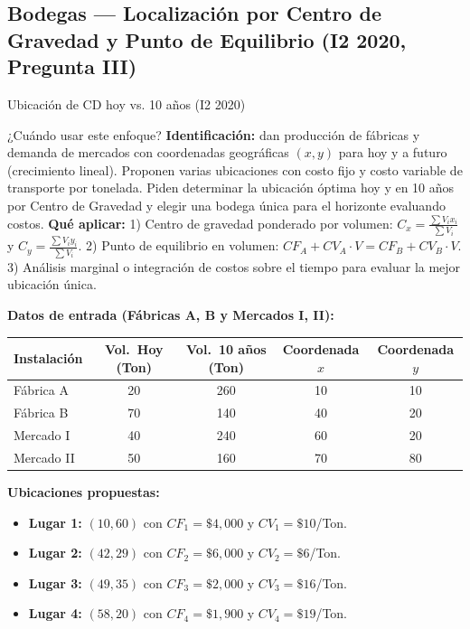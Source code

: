 \subsection[Bodegas: Localización (I2 2020)]{Bodegas --- Localización por Centro de Gravedad y Punto de Equilibrio (I2 2020, Pregunta III)}

\begin{ejercicio}{Ubicación de CD hoy vs. 10 años (I2 2020)}

\begin{tipprueba}{¿Cuándo usar este enfoque?}
\textbf{Identificación:} dan producción de fábricas y demanda de mercados con coordenadas geográficas $(x,y)$ para hoy y a futuro (crecimiento lineal). Proponen varias ubicaciones con costo fijo y costo variable de transporte por tonelada. Piden determinar la ubicación óptima hoy y en 10 años por Centro de Gravedad y elegir una bodega única para el horizonte evaluando costos.
\textbf{Qué aplicar:} 
1) Centro de gravedad ponderado por volumen: $C_x = \frac{\sum V_i x_i}{\sum V_i}$ y $C_y = \frac{\sum V_i y_i}{\sum V_i}$.
2) Punto de equilibrio en volumen: $CF_A + CV_A \cdot V = CF_B + CV_B \cdot V$.
3) Análisis marginal o integración de costos sobre el tiempo para evaluar la mejor ubicación única.
\end{tipprueba}

\textbf{Datos de entrada (Fábricas A, B y Mercados I, II):}
\begin{center}\small
\begin{tabular}{@{}lcccc@{}}
  \toprule
  Instalación & Vol.\ Hoy (Ton) & Vol.\ 10 años (Ton) & Coordenada $x$ & Coordenada $y$ \\
  \midrule
  Fábrica A  & 20 & 260 & 10 & 10 \\
  Fábrica B  & 70 & 140 & 40 & 20 \\
  Mercado I  & 40 & 240 & 60 & 20 \\
  Mercado II & 50 & 160 & 70 & 80 \\
  \bottomrule
\end{tabular}
\end{center}

\textbf{Ubicaciones propuestas:}
\begin{itemize}[leftmargin=1.4em, itemsep=0pt]
  \item \textbf{Lugar 1:} $(10, 60)$ con $CF_1 = \$4{,}000$ y $CV_1 = \$10$/Ton.
  \item \textbf{Lugar 2:} $(42, 29)$ con $CF_2 = \$6{,}000$ y $CV_2 = \$6$/Ton.
  \item \textbf{Lugar 3:} $(49, 35)$ con $CF_3 = \$2{,}000$ y $CV_3 = \$16$/Ton.
  \item \textbf{Lugar 4:} $(58, 20)$ con $CF_4 = \$1{,}900$ y $CV_4 = \$19$/Ton.
\end{itemize}


\end{ejercicio}
